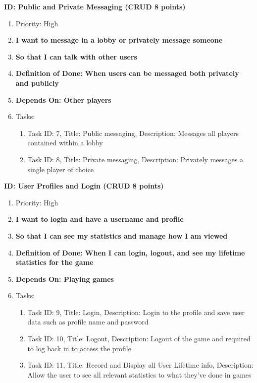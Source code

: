 \documentclass[12pt]{article}
\begin{document}
\textbf{ID: Public and Private Messaging (CRUD 8 points)}
\begin{enumerate}
    \item Priority: High
    \item \textbf{I want to message in a lobby or privately message someone}
    \item \textbf{So that I can talk with other users}
    \item \textbf{Definition of Done: When users can be messaged both privately and publicly}
    \item \textbf{Depends On: Other players}
    \item Tasks:
    \begin{enumerate}
        \item Task ID: 7, Title: Public messaging, Description: Messages all players contained within a lobby
        \item Task ID: 8, Title: Private messaging, Description: Privately messages a single player of choice
    \end{enumerate}
\end{enumerate}
\textbf{ID: User Profiles and Login (CRUD 8 points)}
\begin{enumerate}
    \item Priority: High
    \item \textbf{I want to login and have a username and profile}
    \item \textbf{So that I can see my statistics and manage how I am viewed}
    \item \textbf{Definition of Done: When I can login, logout, and see my lifetime statistics for the game}
    \item \textbf{Depends On: Playing games}
    \item Tasks:
    \begin{enumerate}
        \item Task ID: 9, Title: Login, Description: Login to the profile and save user data such as profile name and password
        \item Task ID: 10, Title: Logout, Description: Logout of the game and required to log back in to access the profile
        \item Task ID: 11, Title: Record and Display all User Lifetime info, Description: Allow the user to see all relevant statistics to what they've done in games
    \end{enumerate}
\end{enumerate}
\end{document}
